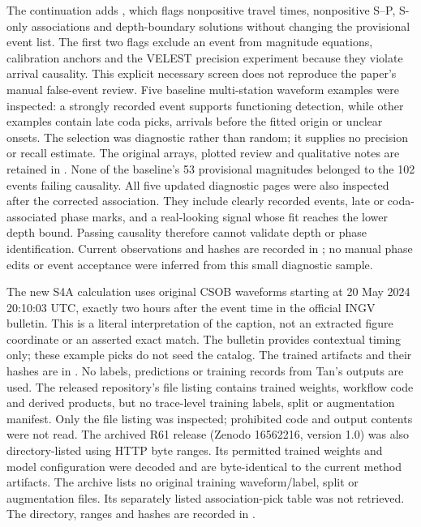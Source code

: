 The continuation adds , which flags nonpositive travel times, nonpositive S--P, S-only associations and depth-boundary solutions without changing the provisional event list. The first two flags exclude an event from magnitude equations, calibration anchors and the VELEST precision experiment because they violate arrival causality. This explicit necessary screen does not reproduce the paper's manual false-event review. Five baseline multi-station waveform examples were inspected: a strongly recorded event supports functioning detection, while other examples contain late coda picks, arrivals before the fitted origin or unclear onsets. The selection was diagnostic rather than random; it supplies no precision or recall estimate. The original arrays, plotted review and qualitative notes are retained in . None of the baseline's 53 provisional magnitudes belonged to the 102 events failing causality. All five updated diagnostic pages were also inspected after the corrected association. They include clearly recorded events, late or coda-associated phase marks, and a real-looking signal whose fit reaches the lower depth bound. Passing causality therefore cannot validate depth or phase identification. Current observations and hashes are recorded in ; no manual phase edits or event acceptance were inferred from this small diagnostic sample.

The new S4A calculation uses original CSOB waveforms starting at 20 May 2024 20:10:03 UTC, exactly two hours after the event time in the official INGV bulletin. This is a literal interpretation of the caption, not an extracted figure coordinate or an asserted exact match. The bulletin provides contextual timing only; these example picks do not seed the catalog. The trained artifacts and their hashes are in . No labels, predictions or training records from Tan's outputs are used. The released repository's file listing contains trained weights, workflow code and derived products, but no trace-level training labels, split or augmentation manifest. Only the file listing was inspected; prohibited code and output contents were not read. The archived R61 release (Zenodo 16562216, version 1.0) was also directory-listed using HTTP byte ranges. Its permitted trained weights and model configuration were decoded and are byte-identical to the current method artifacts. The archive lists no original training waveform/label, split or augmentation files. Its separately listed association-pick table was not retrieved. The directory, ranges and hashes are recorded in .

